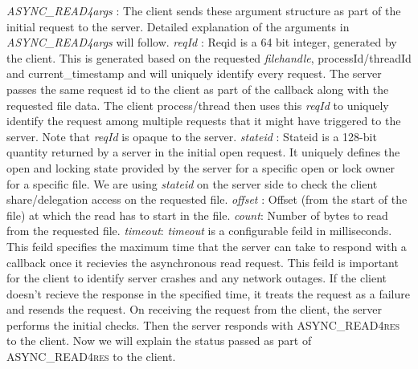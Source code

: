 \noindent\textit{ASYNC\_READ4args} : The client sends these argument structure as part of the initial request to the server. Detailed explanation of the arguments in \textit{ASYNC\_READ4args} will follow. 
\hfill \break \newline
\noindent\textit{reqId} : Reqid is a 64 bit integer, generated by the client. This is generated based on the requested \textit{filehandle}, processId/threadId and current\_timestamp and will uniquely identify every request. The server passes the same request id to the client as part of the callback along with the requested file data. The client process/thread then uses this  \textit{reqId} to uniquely identify the request among multiple requests that it might have triggered to the server. Note that \textit{reqId} is opaque to the server.
\hfill \break \newline
\noindent\textit{stateid} : Stateid is a 128-bit quantity returned by a server in the initial open request. It uniquely defines the open and locking state provided by the server for a specific open or lock owner for a specific file. We are using \textit{stateid} on the server side to check the client share/delegation access on the requested file. 
\hfill \break \newline
\noindent\textit{offset} : Offset (from the start of the file) at which the read has to start in the file. 
\hfill \break \newline
\noindent\textit{count}: Number of bytes to read from the requested file.
\hfill \break \newline
\noindent\textit{timeout}: \textit{timeout} is a configurable feild in milliseconds. This feild specifies the maximum time that the server can take to respond with a callback once it recievies the asynchronous read request. This feild is important for the client to identify server crashes and any network outages. If the client doesn't recieve the response in the specified time, it treats the request as a failure and resends the request.     
\hfill \break \newline
\noindent On receiving the request from the client, the server performs the initial checks. Then the server responds with \textsc{ASYNC\_READ4res} to the client. Now we will explain the status passed as part of \textsc{ASYNC\_READ4res} to the client.  

